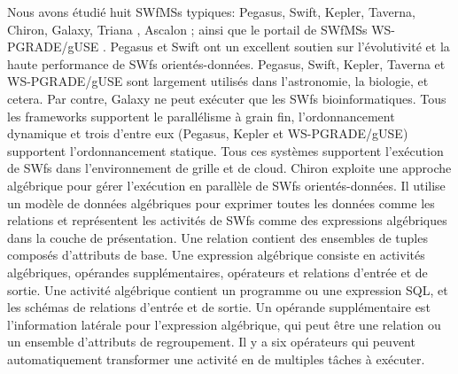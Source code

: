 Nous avons étudié huit SWfMSs typiques: Pegasus, Swift, Kepler, Taverna, Chiron, Galaxy, Triana \cite{Taylor2007}, Ascalon \cite{Fahringer2007}; ainsi que le portail de SWfMSs WS-PGRADE/gUSE \cite{Kacsuk2012}.
Pegasus et Swift ont un excellent soutien sur l'évolutivité et la haute performance de SWfs orientés-données.
Pegasus, Swift, Kepler, Taverna et WS-PGRADE/gUSE sont largement utilisés dans l'astronomie, la biologie, et cetera. Par contre, Galaxy ne peut exécuter que les SWfs bioinformatiques.
Tous les frameworks supportent le parallélisme à grain fin, l'ordonnancement dynamique et trois d'entre eux (Pegasus, Kepler et WS-PGRADE/gUSE) supportent l'ordonnancement statique. Tous ces systèmes supportent l'exécution de SWfs dans l'environnement de grille et de cloud.
Chiron exploite une approche algébrique \cite{Ozsu2011} pour gérer l'exécution en parallèle de SWfs orientés-données. 
Il utilise un modèle de données algébriques pour exprimer toutes les données comme les relations et représentent les activités de SWfs comme des expressions algébriques dans la couche de présentation.
Une relation contient des ensembles de tuples composés d'attributs de base.
Une expression algébrique consiste en activités algébriques, opérandes supplémentaires, opérateurs et relations d'entrée et de sortie.
Une activité algébrique contient un programme ou une expression SQL, et les schémas de relations d'entrée et de sortie.
Un opérande supplémentaire est l'information latérale pour l'expression algébrique, qui peut être une relation ou un ensemble d'attributs de regroupement.
Il y a six opérateurs qui peuvent automatiquement transformer une activité en de multiples tâches à exécuter.

